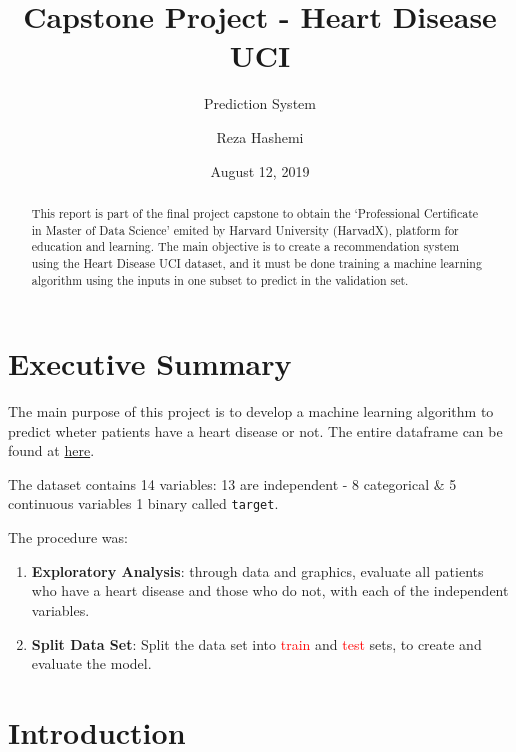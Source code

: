 \documentclass[]{article}
\title{Capstone Project - Heart Disease UCI}
\subtitle{Prediction System}
\author{Reza Hashemi}
\date{August 12, 2019}
\providecommand{\tightlist}{%
  \setlength{\itemsep}{0pt}\setlength{\parskip}{0pt}}
\begin{document}
\maketitle
\begin{abstract}
This report is part of the final project capstone to obtain the
`Professional Certificate in Master of Data Science' emited by Harvard
University (HarvadX), platform for education and learning. The main
objective is to create a recommendation system using the Heart Disease
UCI dataset, and it must be done training a machine learning algorithm
using the inputs in one subset to predict in the validation set.
\end{abstract}

{
\setcounter{tocdepth}{3}
\tableofcontents
}
\pagebreak

\hypertarget{executive-summary}{%
\section{Executive Summary}\label{executive-summary}}

The main purpose of this project is to develop a machine learning
algorithm to predict wheter patients have a heart disease or not. The
entire dataframe can be found at
\href{https://archive.ics.uci.edu/ml/datasets/Heart+Disease}{here}.

The dataset contains 14 variables: 13 are independent - 8 categorical \&
5 continuous variables 1 binary called \texttt{target}.

The procedure was:

\begin{enumerate}
\def\labelenumi{\arabic{enumi}.}
\tightlist
\item
  \textbf{\textcolor{my.dark.gray}{Exploratory Analysis}}: through data
  and graphics, evaluate all patients who have a heart disease and those
  who do not, with each of the independent variables.\\
\item
  \textbf{\textcolor{my.dark.gray}{Split Data Set}}: Split the data set
  into \textcolor{red}{train} and \textcolor{red}{test} sets, to create
  and evaluate the model.
\end{enumerate}

\hypertarget{introduction}{%
\section{Introduction}\label{introduction}}
\end{document}
